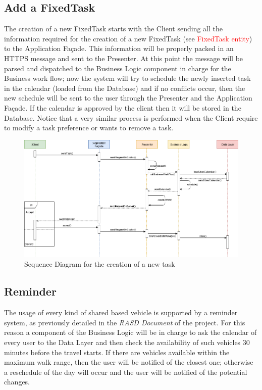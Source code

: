 \subsection{Add a FixedTask}
The creation of a new FixedTask starts with the Client sending all the information required for the creation of a new FixedTask (see \textcolor{red}{FixedTask entity}) to the Application Façade. This information will be properly packed in an HTTPS message and sent to the Presenter. At this point the message will be parsed and dispatched to the Business Logic component in charge for the Business work flow; now the system will try to schedule the newly inserted task in the calendar (loaded from the Database) and if no conflicts occur, then the new schedule will be sent to the user through the Presenter and the Application Façade. If the calendar is approved by the client then it will be stored in the Database.
Notice that a very similar process is performed when the Client require to modify a task preference or wants to remove a task. 

\begin{figure}[H]
    \centering
    \includegraphics[scale=0.4]{Pictures/RunTimeView/addTask.png}
    \caption{Sequence Diagram for the creation of a new task}
    \label{fig:sequenceAddTask}
\end{figure}

\subsection{Reminder}
The usage of every kind of shared based vehicle is supported by a reminder system, as previously detailed in the \emph{RASD Document} of the project. For this reason a component of the Business Logic will be in charge to ask the calendar of every user to the Data Layer and then check the availability of such vehicles 30 minutes before the travel starts. If there are vehicles available within the maximum walk range, then the user will be notified of the closest one; otherwise a reschedule of the day will occur and the user will be notified of the potential changes. 


